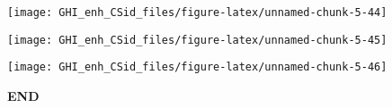 \documentclass[
  10pt,
  a4paper,oneside]{article}
\begin{document}
\begin{center}\texttt{[image: GHI\_enh\_CSid\_files/figure-latex/unnamed-chunk-5-44]} \end{center}

\begin{center}\texttt{[image: GHI\_enh\_CSid\_files/figure-latex/unnamed-chunk-5-45]} \end{center}

\begin{center}\texttt{[image: GHI\_enh\_CSid\_files/figure-latex/unnamed-chunk-5-46]} \end{center}

\textbf{END}
\end{document}
